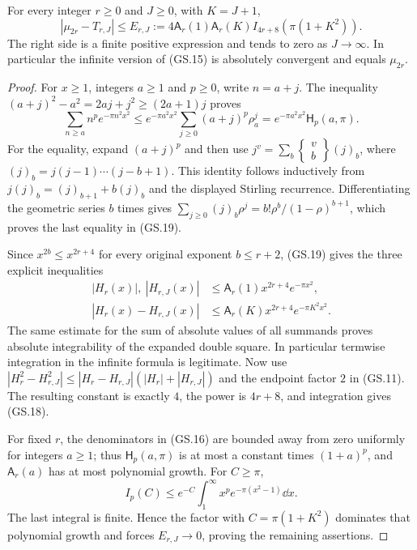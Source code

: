 \begin{theorem}
For every integer $r\ge0$ and $J\ge0$, with $K=J+1$,
\begin{equation}
 |\mu_{2r}-T_{r,J}|\le E_{r,J}:=
 4\mathsf A_r(1)\mathsf A_r(K)
 I_{4r+8}(\pi(1+K^2)).\tag{GS.18}
\end{equation}
The right side is a finite positive expression and tends to zero as
$J\to\infty$. In particular the infinite version of (GS.15) is
absolutely convergent and equals $\mu_{2r}$.
\end{theorem}
\begin{proof}
For $x\ge1$, integers $a\ge1$ and $p\ge0$, write $n=a+j$.
The inequality $(a+j)^2-a^2=2aj+j^2\ge(2a+1)j$ proves
\begin{equation}
 \sum_{n\ge a}n^p e^{-\pi n^2x^2}
 \le e^{-\pi a^2x^2}\sum_{j\ge0}(a+j)^p\rho_a^j
 =e^{-\pi a^2x^2}\mathsf H_p(a,\pi).\tag{GS.19}
\end{equation}
For the equality, expand $(a+j)^p$ and then use
$j^v=\sum_b\left\{\begin{smallmatrix}v\\b\end{smallmatrix}\right\}(j)_b$,
where $(j)_b=j(j-1)\cdots(j-b+1)$. This identity follows
inductively from $j(j)_b=(j)_{b+1}+b(j)_b$ and the displayed
Stirling recurrence. Differentiating the geometric series $b$
times gives
$\sum_{j\ge0}(j)_b\rho^j=b!\rho^b/(1-\rho)^{b+1}$,
which proves the last equality in (GS.19).

Since $x^{2b}\le x^{2r+4}$ for every original exponent $b\le r+2$,
(GS.19) gives the three explicit inequalities
\begin{align*}
 |H_r(x)|,\ |H_{r,J}(x)|
 &\le\mathsf A_r(1)x^{2r+4}e^{-\pi x^2},\\
 |H_r(x)-H_{r,J}(x)|
 &\le\mathsf A_r(K)x^{2r+4}e^{-\pi K^2x^2}.
\end{align*}
The same estimate for the sum of absolute values of all summands
proves absolute integrability of the expanded double square. In
particular termwise integration in the infinite formula is legitimate.
Now use $|H_r^2-H_{r,J}^2|\le|H_r-H_{r,J}|(|H_r|+|H_{r,J}|)$
and the endpoint factor $2$ in (GS.11). The resulting constant is
exactly $4$, the power is $4r+8$, and integration gives (GS.18).

For fixed $r$, the denominators in (GS.16) are bounded away from
zero uniformly for integers $a\ge1$; thus $\mathsf H_p(a,\pi)$
is at most a constant times $(1+a)^p$, and $\mathsf A_r(a)$
has at most polynomial growth. For $C\ge\pi$,
\[
 I_p(C)\le e^{-C}\int_1^\infty x^p e^{-\pi(x^2-1)}\dd x.
\]
The last integral is finite. Hence the factor with
$C=\pi(1+K^2)$ dominates that polynomial growth and forces
$E_{r,J}\to0$, proving the remaining assertions.
\end{proof}

